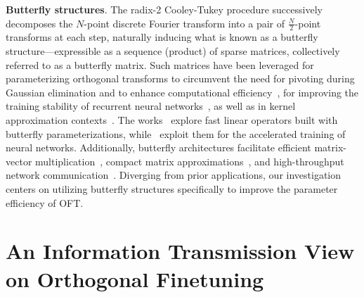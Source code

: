 \textbf{Butterfly structures}. The radix-2 Cooley-Tukey procedure successively decomposes the $N$-point discrete Fourier transform into a pair of $\frac{N}{2}$-point transforms at each step, naturally inducing what is known as a butterfly structure—expressible as a sequence (product) of sparse matrices, collectively referred to as a butterfly matrix. Such matrices have been leveraged for parameterizing orthogonal transforms to circumvent the need for pivoting during Gaussian elimination and to enhance computational efficiency~\cite{parker1995random}, for improving the training stability of recurrent neural networks~\cite{jing2017tunable}, as well as in kernel approximation contexts~\cite{munkhoeva2018quadrature}. The works~\cite{dao2019learning,dao2019kaleidoscope} explore fast linear operators built with butterfly parameterizations, while~\cite{chen2022pixelated,dao2022monarch} exploit them for the accelerated training of neural networks. Additionally, butterfly architectures facilitate efficient matrix-vector multiplication~\cite{michielssen1996multilevel,o2010algorithm}, compact matrix approximations~\cite{li2015butterfly}, and high-throughput network communication~\cite{klasing1994broadcasting,li2003linear,rajasingh2016transmission}. Diverging from prior applications, our investigation centers on utilizing butterfly structures specifically to improve the parameter efficiency of OFT.

\section{An Information Transmission View on Orthogonal Finetuning}

